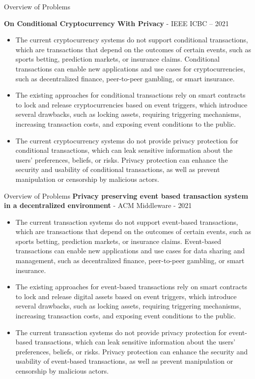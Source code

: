 \documentclass[10pt,aspectratio=169]{beamer}
\begin{document}
\begin{frame}{Overview of Problems}

\textbf {On Conditional Cryptocurrency With Privacy} - {IEEE ICBC} -- {2021}
\begin{itemize} 
\item The current cryptocurrency systems do not support conditional transactions, which are transactions that depend on the outcomes of certain events, such as sports betting, prediction markets, or insurance claims. Conditional transactions can enable new applications and use cases for cryptocurrencies, such as decentralized finance, peer-to-peer gambling, or smart insurance. 
\item The existing approaches for conditional transactions rely on smart contracts to lock and release cryptocurrencies based on event triggers, which introduce several drawbacks, such as locking assets, requiring triggering mechanisms, increasing transaction costs, and exposing event conditions to the public. 
\item The current cryptocurrency systems do not provide privacy protection for conditional transactions, which can leak sensitive information about the users’ preferences, beliefs, or risks. Privacy protection can enhance the security and usability of conditional transactions, as well as prevent manipulation or censorship by malicious actors. 
\end{itemize}
\end{frame}

\begin{frame}{Overview of Problems}
\textbf {Privacy preserving event based transaction system in a decentralized environment} - {ACM Middleware} - {2021}
\begin{itemize} 
\item The current transaction systems do not support event-based transactions, which are transactions that depend on the outcomes of certain events, such as sports betting, prediction markets, or insurance claims. Event-based transactions can enable new applications and use cases for data sharing and management, such as decentralized finance, peer-to-peer gambling, or smart insurance. 
\item The existing approaches for event-based transactions rely on smart contracts to lock and release digital assets based on event triggers, which introduce several drawbacks, such as locking assets, requiring triggering mechanisms, increasing transaction costs, and exposing event conditions to the public. 
\item The current transaction systems do not provide privacy protection for event-based transactions, which can leak sensitive information about the users’ preferences, beliefs, or risks. Privacy protection can enhance the security and usability of event-based transactions, as well as prevent manipulation or censorship by malicious actors. 
\end{itemize}
\end{frame}
\end{document}
